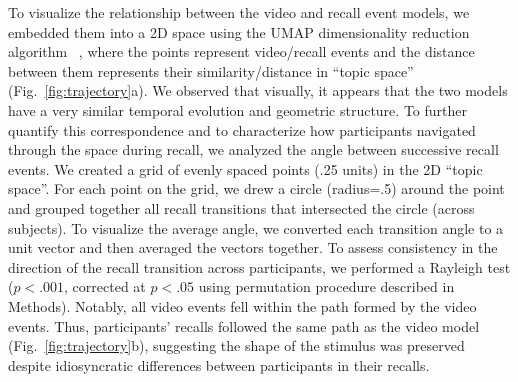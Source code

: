 \documentclass{article}
\begin{document}
To visualize the relationship between the video and recall event models, we embedded them into a 2D space using the UMAP dimensionality reduction algorithm ~\citep{McInHeal18}, where the points represent video/recall events and the distance between them represents their similarity/distance in ``topic space'' (Fig.~\ref{fig:trajectory}a).  We observed that visually, it appears that the two models have a very similar temporal evolution and geometric structure. To further quantify this correspondence and to characterize how participants navigated through the space during recall, we analyzed the angle between successive recall events. We created a grid of evenly spaced points (.25 units) in the 2D ``topic space''. For each point on the grid, we drew a circle (radius=.5) around the point and grouped together all recall transitions that intersected the circle (across subjects). To visualize the average angle, we converted each transition angle to a unit vector and then averaged the vectors together. To assess consistency in the direction of the recall transition across participants, we performed a Rayleigh test ($p<.001$, corrected at $p<.05$ using permutation procedure described in Methods). Notably, all video events fell within the path formed by the video events.  Thus, participants' recalls followed the same path as the video model (Fig.~\ref{fig:trajectory}b), suggesting the shape of the stimulus was preserved despite idiosyncratic differences between participants in their recalls.

\end{document}
